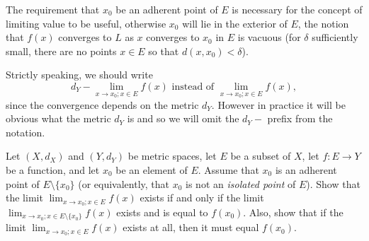 \begin{rmk}\label{3.1.7}
  The requirement that \(x_0\) be an adherent point of \(E\) is necessary for the concept of limiting value to be useful, otherwise \(x_0\) will lie in the exterior of \(E\), the notion that \(f(x)\) converges to \(L\) as \(x\) converges to \(x_0\) in \(E\) is vacuous
  (for \(\delta\) sufficiently small, there are no points \(x \in E\) so that \(d(x, x_0) < \delta\)).
\end{rmk}

\begin{rmk}\label{3.1.8}
  Strictly speaking, we should write
  \[
    d_Y - \lim_{x \to x_0 ; x \in E} f(x) \text{ instead of } \lim_{x \to x_0 ; x \in E} f(x),
  \]
  since the convergence depends on the metric \(d_Y\).
  However in practice it will be obvious what the metric \(d_Y\) is and so we will omit the \(d_Y -\) prefix from the notation.
\end{rmk}

\exercisesection

\begin{ex}\label{ex:3.1.1}
  Let \((X, d_X)\) and \((Y, d_Y)\) be metric spaces, let \(E\) be a subset of \(X\), let \(f : E \to Y\) be a function, and let \(x_0\) be an element of \(E\).
  Assume that \(x_0\) is an adherent point of \(E \setminus \{x_0\}\)
  (or equivalently, that \(x_0\) is not an \emph{isolated point} of \(E\)).
  Show that the limit \(\lim_{x \to x_0 ; x \in E} f(x)\) exists if and only if the limit \(\lim_{x \to x_0 ; x \in E \setminus \{x_0\}} f(x)\) exists and is equal to \(f(x_0)\).
  Also, show that if the limit \(\lim_{x \to x_0 ; x \in E} f(x)\) exists at all, then it must equal \(f(x_0)\).
\end{ex}

